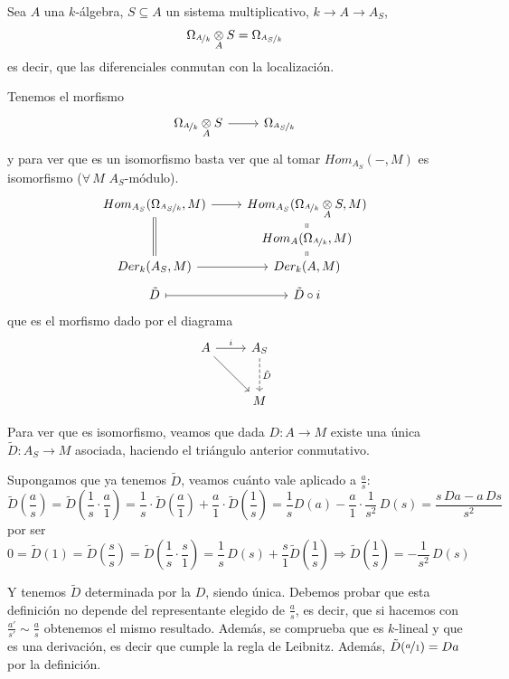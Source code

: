 \begin{prop} Sea $A$ una $k$-\'algebra, $S\subseteq A$ un sistema multiplicativo, $k \to A \to A_S$,
      $$\Omega_{\nicefrac{A}{k}} \underset{A}{\otimes} S = \Omega_{\nicefrac{A_S}{k}}$$
      es decir, que las diferenciales conmutan con la localizaci\'on.
\end{prop}
\begin{dem}
    Tenemos el morfismo 
    $$\bt \Omega_{\nicefrac{A}{k}} \underset{A}{\otimes} S \rar & \Omega_{\nicefrac{A_S}{k}} \et$$
    y para ver que es un isomorfismo basta ver que al tomar $Hom_{A_S}(-,M)$ es isomorfismo ($\forall \, M$ $A_S$-m\'odulo).
    $$\bt Hom_{A_S}(\Omega_{\nicefrac{A_S}{k}} , M)\rar &Hom_{A_S}( \Omega_{\nicefrac{A}{k}} \underset{A}{\otimes} S, M) \\[-5mm] & \arrow[equal]{u} Hom_{A}(\Omega_{\nicefrac{A}{k}} , M) \\[-5mm] Der_k(A_S,M) \arrow[equal]{uu} \rar & \arrow[equal]{u} Der_k(A,M) \\[-5mm] \tilde D \rarmaps & \tilde D \circ i \et$$
    que es el morfismo dado por el diagrama
    $$\bt A \rar{i} \arrow{dr} & A_S \arrow[dashed]{d}{\tilde D} \\[3mm] & M \et$$

    Para ver que es isomorfismo, veamos que dada $D:A\longrightarrow M$ existe una \'unica $\tilde D: A_S \longrightarrow M$ asociada, haciendo el tri\'angulo anterior conmutativo. 

    Supongamos que ya tenemos $\tilde D$, veamos cu\'anto vale aplicado a $\frac{a}{s}$:
    $$\tilde D\left( \frac{a}{s} \right) = \tilde  D\left(  \frac{1}{s}\cdot \frac{a}{1} \right)= \frac{1}{s}\cdot \tilde   D\left(  \frac{a}{1} \right) + \frac{a}{1} \cdot  \tilde  D\left(  \frac{1}{s} \right) = \frac{1}{s} D(a) - \frac{a}{1} \cdot \frac{1}{s^2} \, D(s) = \frac{s \, Da - a \, Ds}{s^2}$$
    por ser
    $$0 = \tilde D(1) = \tilde  D\left(  \frac{s}{s} \right) = \tilde  D\left(  \frac{1}{s}\cdot \frac{s}{1} \right) = \frac{1}{s} \, D(s) + \frac{s}{1} \tilde  D\left(  \frac{1}{s} \right) \Rightarrow  \tilde  D\left(  \frac{1}{s} \right) = - \frac{1}{s^2} \, D(s) $$

    Y tenemos $\tilde D$ determinada por la $D$, siendo \'unica. Debemos probar que esta definici\'on no depende del representante elegido de $\frac{a}{s}$, es decir, que si hacemos con $\frac{a'}{s'} \sim \frac{a}{s}$ obtenemos el mismo resultado. Adem\'as, se comprueba que es $k$-lineal y que es una derivaci\'on, es decir que cumple la regla de Leibnitz. Adem\'as, $\tilde D(\nicefrac{a}{1}) = Da$ por la definici\'on.
\end{dem}

